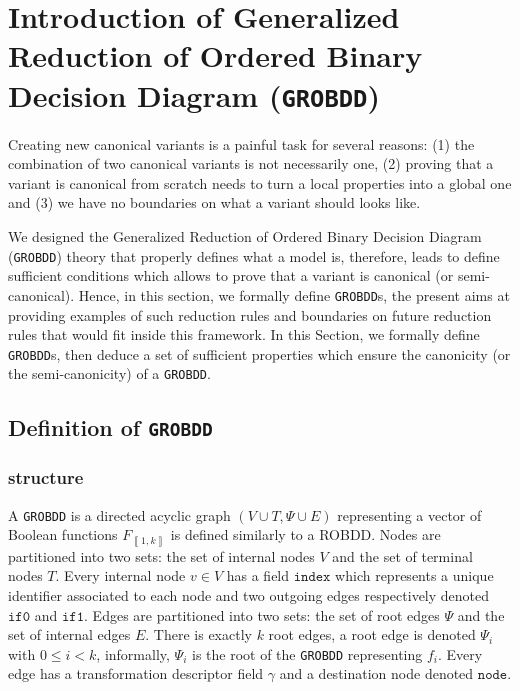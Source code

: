 \documentclass[a4paper,10pt]{article}
\newcommand{\GroBdd}{\texttt{GROBDD}}
\newcommand{\fieldIndex}{\texttt{index}}
\newcommand{\fieldNode}{\texttt{node}}
\newcommand{\fieldThen}{\mathtt{if1}}
\newcommand{\fieldElse}{\mathtt{if0}}
\newcommand{\bras}[1]{{\left\llbracket{#1}\right\rrbracket}}
\begin{document}
\section{Introduction of Generalized Reduction of Ordered Binary Decision Diagram (\GroBdd{})}

Creating new canonical variants is a painful task for several reasons: (1) the combination of two canonical variants is not necessarily one, (2) proving that a variant is canonical from scratch needs to turn a local properties into a global one and (3) we have no boundaries on what a variant should looks like.

We designed the Generalized Reduction of Ordered Binary Decision Diagram (\GroBdd{}) theory that properly defines what a model is, therefore, leads to define sufficient conditions which allows to prove that a variant is canonical (or semi-canonical).
Hence, in this section, we formally define \GroBdd{}s, the present aims at providing examples of such reduction rules and boundaries on future reduction rules that would fit inside this framework.
In this Section, we formally define \GroBdd{}s, then deduce a set of sufficient properties which ensure the canonicity (or the semi-canonicity) of a \GroBdd{}.



\subsection{Definition of \GroBdd{}}

\subsubsection{structure}

A \GroBdd{} is a directed acyclic graph $(V\cup T, \Psi \cup E)$ representing a vector of Boolean functions $F_\bras{1, k}$ is defined similarly to a ROBDD.
Nodes are partitioned into two sets: the set of internal nodes $V$ and the set of terminal nodes $T$.
Every internal node $v\in V$ has a field $\fieldIndex{}$ which represents a unique identifier associated to each node and two outgoing edges respectively denoted $\fieldElse{}$ and $\fieldThen{}$.
Edges are partitioned into two sets: the set of root edges $\Psi$ and the set of internal edges $E$.
There is exactly $k$ root edges, a root edge is denoted $\Psi_i$ with $0\leq i < k$, informally, $\Psi_i$ is the root of the \GroBdd{} representing $f_i$.
Every edge has a transformation descriptor field $\gamma$ and a destination node denoted $\fieldNode{}$.
\end{document}
